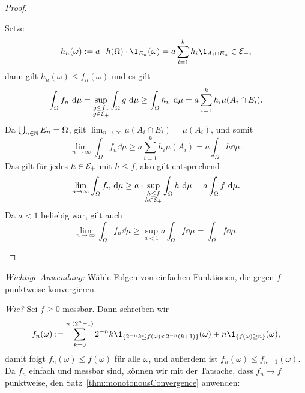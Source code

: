 \documentclass[language=ngerman]{../../Template/TemplateLecture}
\begin{document}
\begin{proof}
\begin{description}
        Setze 
        \begin{equation}
            h_n(\omega) := a \cdot h(\Omega) \cdot \1_{E_n}(\omega) = a\sum_{i = 1}^k h_i \1_{A_i \cap E_n} \in \cE_+,
        \end{equation}
        dann gilt $h_n(\omega) \leq f_n(\omega)$ und es gilt 
        \begin{equation}
            \int_\Omega f_n ~\mathrm{d}\mu = \sup_{\substack{g \leq f_n \\ g \in \mathcal{E}_+}} \int_\Omega g~\mathrm{d}\mu \geq \int_\Omega h_n ~\mathrm{d}\mu = a\sum_{i = 1}^k h_i \mu(A_i \cap E_i).
        \end{equation}
        Da $\bigcup_{n \in \mathbb{N}} E_n = \Omega$, gilt $\lim_{n \to \infty} \mu(A_i \cap E_i) = \mu(A_i)$, und somit 
        \begin{equation}
            \lim_{n \to \infty} \int_\Omega f_n \dd\mu \geq a\sum_{i = 1}^k h_i \mu(A_i) = a\int_\Omega h\dd \mu.
        \end{equation}
        Das gilt für jedes $h \in \mathcal{E}_+$ mit $h \leq f$, also gilt entsprechend 
        \begin{equation}
            \lim_{n \to \infty} \int_\Omega f_n ~\mathrm{d}\mu \geq a \cdot \sup_{\substack{h \leq f \\ h \in \mathcal{E}_+}} \int_\Omega h~\mathrm{d}\mu = a\int_\Omega f ~\mathrm{d}\mu.
        \end{equation}
        Da $a < 1$ beliebig war, gilt auch 
        \begin{equation}
            \lim_{n \to \infty} \int_\Omega f_n \dd\mu \geq \sup_{a < 1} a \int_\Omega f\dd\mu = \int_\Omega f\dd\mu.
        \end{equation}
    \end{description}
\end{proof}




\emph{Wichtige Anwendung:} Wähle Folgen von einfachen Funktionen, die gegen $f$ punktweise konvergieren.

\emph{Wie?} Sei $f \geq 0$ messbar. Dann schreiben wir 
\begin{equation}
    f_n(\omega) := \sum_{k=0}^{n \cdot (2^n - 1)} 2^{-n}k\1_{\set{2^{-n}k \leq f(\omega) < 2^{-n}(k+1)}}(\omega) + n\1_{\set{f(\omega) \geq n}}(\omega),
\end{equation}
damit folgt $f_n(\omega) \leq f(\omega)$ für alle $\omega$, und außerdem ist $f_n(\omega) \leq f_{n+1}(\omega)$. Da $f_n$ einfach und messbar sind, können wir mit der Tatsache, dass $f_n \to f$ punktweise,    den Satz~\ref{thm:monotonousConvergence} anwenden:
\end{document}
